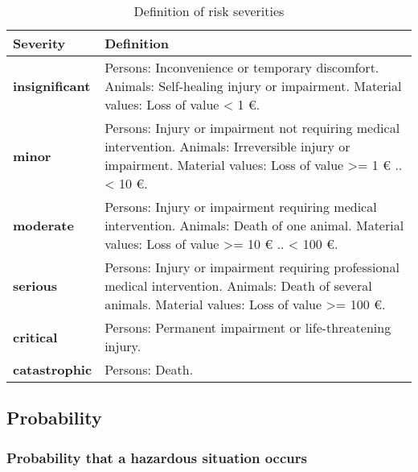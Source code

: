 \documentclass{../../git_submodules/common_docu/doc_class}
\begin{document}
  \begin{table}[H]
    \begin{tabularx}{\textwidth}{|l|X|}
      \hline
      \textbf{Severity} & \textbf{Definition} \\
      \hline
      \textbf{insignificant} & Persons: Inconvenience or temporary discomfort. \newline
      Animals: Self-healing injury or impairment. \newline
      Material values: Loss of value \textless{} 1 \euro. \\
      \hline
      \textbf{minor} & Persons: Injury or impairment not requiring medical intervention. \newline
      Animals: Irreversible injury or impairment.\newline
      Material values: Loss of value \textgreater= 1 \euro{} .. \textless{} 10 \euro. \\
      \hline
      \textbf{moderate} & Persons: Injury or impairment requiring medical intervention. \newline
      Animals: Death of one animal. \newline
      Material values: Loss of value \textgreater= 10 \euro{} .. \textless{} 100 \euro. \\
      \hline
      \textbf{serious} & Persons: Injury or impairment requiring professional medical intervention. \newline
      Animals: Death of several animals. \newline
      Material values: Loss of value \textgreater= 100 \euro. \\
      \hline
      \textbf{critical} & Persons: Permanent impairment or life-threatening injury. \\
      \hline
      \textbf{catastrophic} & Persons: Death.\\
      \hline
    \end{tabularx}
    \caption{Definition of risk severities}
  \end{table}


\subsection{Probability}

\subsubsection{Probability that a hazardous situation occurs}
\end{document}
